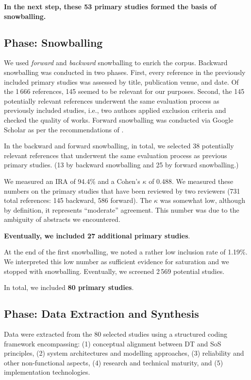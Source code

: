 \textbf{In the next step, these 53 primary studies formed the basis of snowballing.}


\subsection{Phase: Snowballing}\label{subsec:literature-review-study-phases-snowballing}

We used \textit{forward} and \textit{backward} snowballing to enrich the corpus.
Backward snowballing was conducted in two phases. First, every reference in the previously included primary studies was assessed by title, publication venue, and date. Of the 1\,666 references, 145 seemed to be relevant for our purposes. Second, the 145 potentially relevant references underwent the same evaluation process as previously included studies, i.e., two authors applied exclusion criteria and checked the quality of works. Forward snowballing was conducted via Google Scholar as per the recommendations of \citet{wohlin2020guidelines}.

In the backward and forward snowballing, in total, we selected 38 potentially relevant references that underwent the same evaluation process as previous primary studies. (13 by backward snowballing and 25 by forward snowballing.)

We measured an IRA of 94.4\% and a Cohen's $\kappa$ of 0.488. We measured these numbers on the primary studies that have been reviewed by two reviewers (731 total references: 145 backward, 586 forward). The $\kappa$ was somewhat low, although by definition, it represents ``moderate'' agreement. This number was due to the ambiguity of abstracts we encountered.

\textbf{Eventually, we included 27 additional primary studies}.

At the end of the first snowballing, we noted a rather low inclusion rate of 1.19\%. We interpreted this low number as sufficient evidence for saturation and we stopped with snowballing. Eventually, we screened 2\,569 potential studies.

\begin{bottomlineframe}
In total, we included \textbf{80 primary studies}.
\end{bottomlineframe}



\subsection{Phase: Data Extraction and Synthesis}
Data were extracted from the 80 selected studies using a structured coding framework encompassing: (1) conceptual alignment between DT and SoS principles, (2) system architectures and modelling approaches, (3) reliability and other non-functional aspects, (4) research and technical maturity, and (5) implementation technologies.

